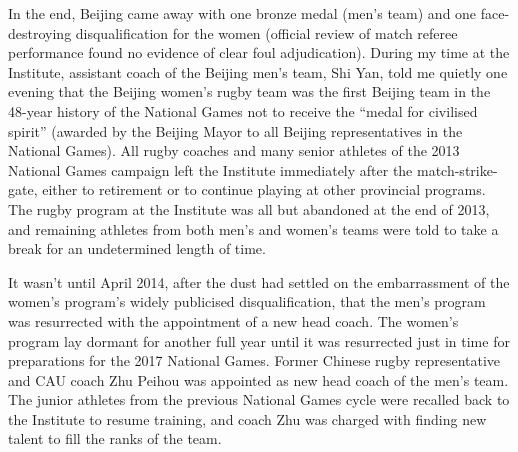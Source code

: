 \begin{CJK}{UTF8}{gbsn}
 In the end, Beijing came away with one bronze medal (men's team) and one face-destroying disqualification for the women (official review of match referee performance found no evidence of clear foul adjudication).  During my time at the Institute, assistant coach of the Beijing men's team, Shi Yan, told me quietly one evening that the Beijing women's rugby team was the first Beijing team in the 48-year history of the National Games not to receive the ``medal for civilised spirit''  (awarded by the Beijing Mayor to all Beijing representatives in the National Games).  All rugby coaches and many senior athletes of the 2013 National Games campaign left the Institute immediately after the match-strike-gate, either to retirement or to continue playing at other provincial programs.  The rugby program at the Institute was all but abandoned at the end of 2013, and remaining athletes from both men's and women's teams were told to take a break for an undetermined length of time.

 It wasn't until April 2014, after the dust had settled on the embarrassment of the women's program's widely publicised disqualification, that the men's program was resurrected with the appointment of a new head coach.  The women's program lay dormant for another full year until it was resurrected just in time for preparations for the 2017 National Games. Former Chinese rugby  representative and CAU coach Zhu Peihou was appointed as new head coach of the men's team.  The junior athletes from the previous National Games cycle were recalled back to the Institute to resume training, and coach Zhu was charged with finding new talent to fill the ranks of the team.


\end{CJK}
